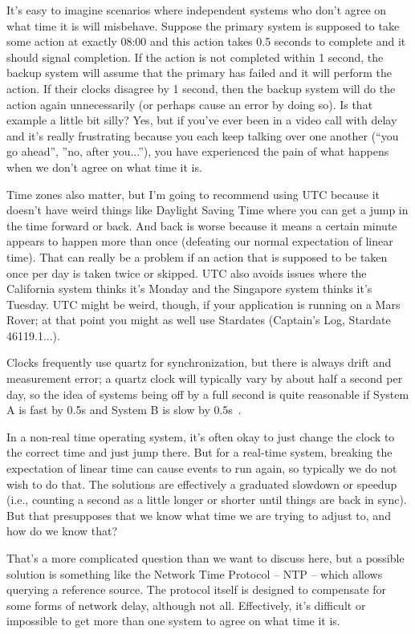 It's easy to imagine scenarios where independent systems who don't agree on what time it is will misbehave. Suppose the primary system is supposed to take some action at exactly 08:00 and this action takes 0.5 seconds to complete and it should signal completion. If the action is not completed within 1 second, the backup system will assume that the primary has failed and it will perform the action. If their clocks disagree by 1 second, then the backup system will do the action again unnecessarily (or perhaps cause an error by doing so). Is that example a little bit silly? Yes, but if you've ever been in a video call with delay and it's really frustrating because you each keep talking over one another (``you go ahead'', ''no, after you...''), you have experienced the pain of what happens when we don't agree on what time it is.

Time zones also matter, but I'm going to recommend using UTC because it doesn't have weird things like Daylight Saving Time where you can get a jump in the time forward or back. And back is worse because it means a certain minute appears to happen more than once (defeating our normal expectation of linear time). That can really be a problem if an action that is supposed to be taken once per day is taken twice or skipped. UTC also avoids issues where the California system thinks it's Monday and the Singapore system thinks it's Tuesday. UTC might be weird, though, if your application is running on a Mars Rover; at that point you might as well use Stardates (Captain's Log, Stardate 46119.1...).


Clocks frequently use quartz for synchronization, but there is always drift and measurement error; a quartz clock will typically vary by about half a second per day, so the idea of systems being off by a full second is quite reasonable if System A is fast by 0.5s and System B is slow by 0.5s~\cite{mte241}.

In a non-real time operating system, it's often okay to just change the clock to the correct time and just jump there. But for a real-time system, breaking the expectation of linear time can cause events to run again, so typically we do not wish to do that. The solutions are effectively a graduated slowdown or speedup (i.e., counting a second as a little longer or shorter until things are back in sync). But that presupposes that we know what time we are trying to adjust to, and how do we know that?

That's a more complicated question than we want to discuss here, but a possible solution is something like the Network Time Protocol -- NTP -- which allows querying a reference source. The protocol itself is designed to compensate for some forms of network delay, although not all. Effectively, it's difficult or impossible to get more than one system to agree on what time it is. 

